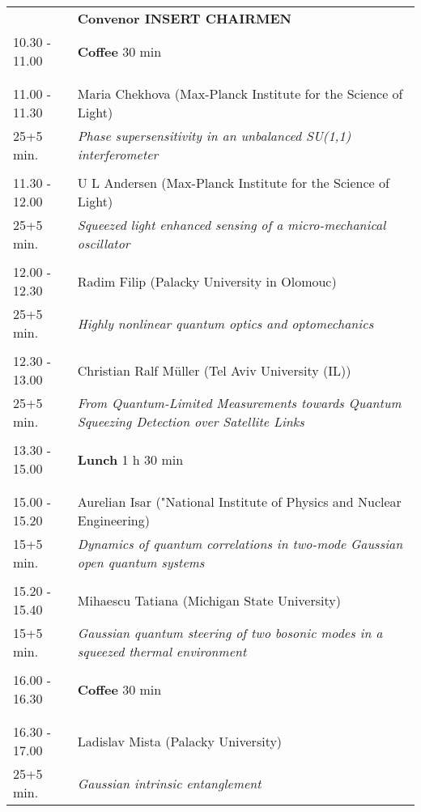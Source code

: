 \begin{longtable}{p{3cm}p{13cm}}
&\hfill {\bf Convenor INSERT CHAIRMEN }\\ 
10.30 - 11.00 & {\bf Coffee} \hfill 30 min \\ 
 & \\ 
 & \\ 
11.00 - 11.30 & Maria Chekhova (Max-Planck Institute for the Science of Light)\\ 
25+5 min. & {\it Phase supersensitivity in an unbalanced SU(1,1) interferometer}\\ 
 & \\ 
11.30 - 12.00 & U L Andersen (Max-Planck Institute for the Science of Light)\\ 
25+5 min. & {\it Squeezed light enhanced sensing of a micro-mechanical oscillator}\\ 
 & \\ 
12.00 - 12.30 & Radim Filip (Palacky University in Olomouc)\\ 
25+5 min. & {\it Highly nonlinear quantum optics and optomechanics}\\ 
 & \\ 
12.30 - 13.00 & Christian Ralf Müller (Tel Aviv University (IL))\\ 
25+5 min. & {\it From Quantum-Limited Measurements towards Quantum Squeezing Detection over Satellite Links}\\ 
 & \\ 
13.30 - 15.00 & {\bf Lunch} \hfill 1 h 30 min \\ 
 & \\ 
 & \\ 
15.00 - 15.20 & Aurelian Isar ("National Institute of Physics and Nuclear Engineering)\\ 
15+5 min. & {\it Dynamics of quantum correlations in two-mode Gaussian open quantum systems}\\ 
 & \\ 
15.20 - 15.40 & Mihaescu Tatiana (Michigan State University)\\ 
15+5 min. & {\it Gaussian quantum steering of two bosonic modes in a squeezed thermal environment}\\ 
 & \\ 
16.00 - 16.30 & {\bf Coffee} \hfill 30 min \\ 
 & \\ 
 & \\ 
16.30 - 17.00 & Ladislav Mista (Palacky University)\\ 
25+5 min. & {\it Gaussian intrinsic entanglement}\\ 

\end{longtable}
